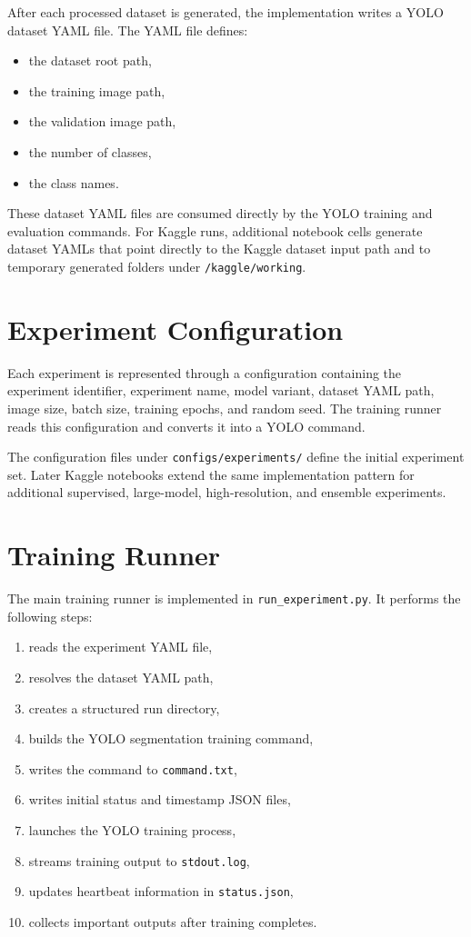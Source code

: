 After each processed dataset is generated, the implementation writes a YOLO dataset YAML file. The YAML file defines:

\begin{itemize}
    \item the dataset root path,
    \item the training image path,
    \item the validation image path,
    \item the number of classes,
    \item the class names.
\end{itemize}

These dataset YAML files are consumed directly by the YOLO training and evaluation commands. For Kaggle runs, additional notebook cells generate dataset YAMLs that point directly to the Kaggle dataset input path and to temporary generated folders under \texttt{/kaggle/working}.

\section{Experiment Configuration}

Each experiment is represented through a configuration containing the experiment identifier, experiment name, model variant, dataset YAML path, image size, batch size, training epochs, and random seed. The training runner reads this configuration and converts it into a YOLO command.

The configuration files under \texttt{configs/experiments/} define the initial experiment set. Later Kaggle notebooks extend the same implementation pattern for additional supervised, large-model, high-resolution, and ensemble experiments.

\section{Training Runner}

The main training runner is implemented in \texttt{run\_experiment.py}. It performs the following steps:

\begin{enumerate}
    \item reads the experiment YAML file,
    \item resolves the dataset YAML path,
    \item creates a structured run directory,
    \item builds the YOLO segmentation training command,
    \item writes the command to \texttt{command.txt},
    \item writes initial status and timestamp JSON files,
    \item launches the YOLO training process,
    \item streams training output to \texttt{stdout.log},
    \item updates heartbeat information in \texttt{status.json},
    \item collects important outputs after training completes.
\end{enumerate}

